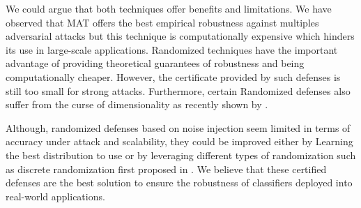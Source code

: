 We could argue that both techniques offer benefits and limitations.
We have observed that MAT offers the best empirical robustness against multiples adversarial attacks but this technique is computationally expensive which hinders its use in large-scale applications.
Randomized techniques have the important advantage of providing theoretical guarantees of robustness and being computationally cheaper.
However, the certificate provided by such defenses is still too small for strong attacks.
Furthermore, certain Randomized defenses also suffer from the curse of dimensionality as recently shown by \cite{kumar2020curse}. 

Although, randomized defenses based on noise injection seem limited in terms of accuracy under attack and scalability, they could be improved either by Learning the best distribution to use or by leveraging different types of randomization such as discrete randomization first proposed in \cite{pinot2020randomization}.
We believe that these certified defenses are the best solution to ensure the robustness of classifiers deployed into real-world applications.

